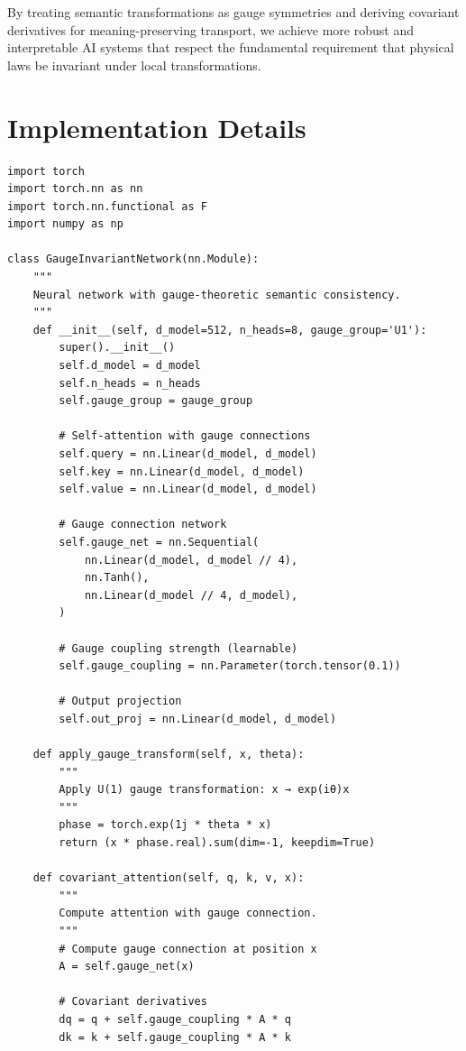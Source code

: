 \documentclass[12pt,letterpaper,twoside]{article}
\begin{document}
By treating semantic transformations as gauge symmetries and deriving covariant derivatives for meaning-preserving transport, we achieve more robust and interpretable AI systems that respect the fundamental requirement that physical laws be invariant under local transformations.

\clearpage

\appendix

\section{Implementation Details}

\begin{verbatim}
import torch
import torch.nn as nn
import torch.nn.functional as F
import numpy as np

class GaugeInvariantNetwork(nn.Module):
    """
    Neural network with gauge-theoretic semantic consistency.
    """
    def __init__(self, d_model=512, n_heads=8, gauge_group='U1'):
        super().__init__()
        self.d_model = d_model
        self.n_heads = n_heads
        self.gauge_group = gauge_group
        
        # Self-attention with gauge connections
        self.query = nn.Linear(d_model, d_model)
        self.key = nn.Linear(d_model, d_model)
        self.value = nn.Linear(d_model, d_model)
        
        # Gauge connection network
        self.gauge_net = nn.Sequential(
            nn.Linear(d_model, d_model // 4),
            nn.Tanh(),
            nn.Linear(d_model // 4, d_model),
        )
        
        # Gauge coupling strength (learnable)
        self.gauge_coupling = nn.Parameter(torch.tensor(0.1))
        
        # Output projection
        self.out_proj = nn.Linear(d_model, d_model)
        
    def apply_gauge_transform(self, x, theta):
        """
        Apply U(1) gauge transformation: x → exp(iθ)x
        """
        phase = torch.exp(1j * theta * x)
        return (x * phase.real).sum(dim=-1, keepdim=True)
    
    def covariant_attention(self, q, k, v, x):
        """
        Compute attention with gauge connection.
        """
        # Compute gauge connection at position x
        A = self.gauge_net(x)
        
        # Covariant derivatives
        dq = q + self.gauge_coupling * A * q
        dk = k + self.gauge_coupling * A * k
        

\end{verbatim}
\end{document}
